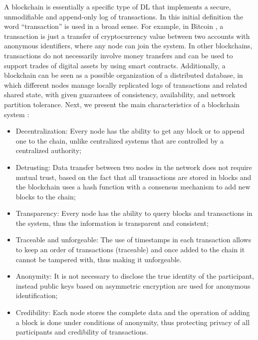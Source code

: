 A blockchain is essentially a specific type of \gls{DL} that implements a secure, unmodifiable and append-only log of transactions. In this initial definition the word “transaction” is used in a broad sense. For example, in Bitcoin \cite{bitcoin}, a transaction is just a transfer of cryptocurrency value between two accounts with anonymous identifiers, where any node can join the system. In other blockchains, transactions do not necessarily involve money transfers and can be used to support trades of digital assets by using smart contracts. Additionally, a blockchain can be seen as a possible organization of a distributed database, in which different nodes manage locally replicated logs of transactions and related shared state, with given guarantees of consistency, availability, and network partition tolerance. Next, we present the main characteristics of a blockchain system \cite{the_blockchain_state_of_the_art}:


\begin{itemize}
    \item Decentralization: Every node has the ability to get any block or to append one to the chain, unlike centralized systems that are controlled by a centralized authority;
    \item Detrusting: Data transfer between two nodes in the network does not require mutual trust, based on the fact that all transactions are stored in blocks and the blockchain uses a hash function with a consensus mechanism to add new blocks to the chain;
    \item Transparency: Every node has the ability to query blocks and transactions in the system, thus the information is transparent and consistent;
    \item Traceable and unforgeable: The use of timestamps in each transaction allows to keep an order of transactions (traceable) and once added to the chain it cannot be tampered with, thus making it unforgeable.
    \item Anonymity: It is not necessary to disclose the true identity of the participant, instead public keys based on asymmetric encryption are used for anonymous identification;
    \item Credibility: Each node stores the complete data and the operation of adding a block is done under conditions of anonymity, thus protecting privacy of all participants and credibility of transactions.
\end{itemize}

